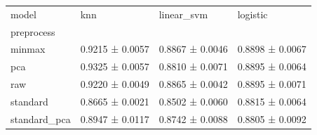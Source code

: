 \begin{tabular}{llll}
\toprule
model & knn & linear_svm & logistic \\
preprocess &  &  &  \\
\midrule
minmax & 0.9215 ± 0.0057 & 0.8867 ± 0.0046 & 0.8898 ± 0.0067 \\
pca & 0.9325 ± 0.0057 & 0.8810 ± 0.0071 & 0.8895 ± 0.0064 \\
raw & 0.9220 ± 0.0049 & 0.8865 ± 0.0042 & 0.8895 ± 0.0071 \\
standard & 0.8665 ± 0.0021 & 0.8502 ± 0.0060 & 0.8815 ± 0.0064 \\
standard_pca & 0.8947 ± 0.0117 & 0.8742 ± 0.0088 & 0.8805 ± 0.0092 \\
\bottomrule
\end{tabular}
